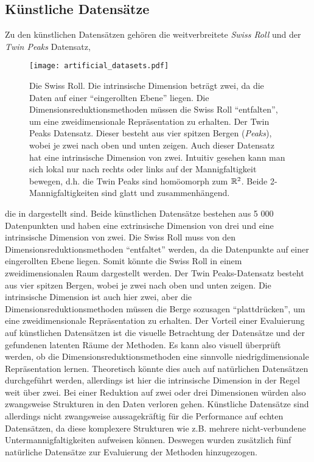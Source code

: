 \subsection{Künstliche Datensätze}
\label{ch:Vergleich:sec:VerwendeteDatensaetze:kuenstlich}
Zu den künstlichen Datensätzen gehören die weitverbreitete \textit{Swiss Roll} und der \textit{Twin Peaks} Datensatz,
\begin{figure}[ht]
	\begin{center}
		\texttt{[image: artificial\_datasets.pdf]}
	\end{center}
	\caption[Künstliche Datensätze]{\figleft Die Swiss Roll. Die intrinsische Dimension beträgt zwei, da die Daten auf einer \enquote{eingerollten Ebene} liegen. Die Dimensionsreduktionsmethoden müssen die Swiss Roll \enquote{entfalten}, um eine zweidimensionale Repräsentation zu erhalten. \figright Der Twin Peaks Datensatz. Dieser besteht aus vier spitzen Bergen (\textit{Peaks}), wobei je zwei nach oben und unten zeigen. Auch dieser Datensatz hat eine intrinsische Dimension von zwei. Intuitiv gesehen kann man sich lokal nur nach rechts oder links auf der Mannigfaltigkeit bewegen, d.h. die Twin Peaks sind homöomorph zum $\mathbb{R}^2$. Beide 2-Mannigfaltigkeiten sind glatt und zusammenhängend.}
	\label{fig:ArtificialDatasets}
\end{figure}
die in  dargestellt sind.
Beide künstlichen Datensätze bestehen aus 5 000 Datenpunkten und haben eine extrinsische Dimension von drei und eine intrinsische
Dimension von zwei. Die Swiss Roll muss von den Dimensionsreduktionsmethoden \enquote{entfaltet} werden, da die Datenpunkte auf einer eingerollten Ebene liegen. Somit könnte die Swiss Roll in einem zweidimensionalen Raum dargestellt werden. Der Twin Peaks-Datensatz besteht aus vier spitzen Bergen, wobei je zwei nach oben und unten zeigen. Die intrinsische Dimension ist auch hier zwei, aber die Dimensionsreduktionsmethoden müssen die Berge sozusagen \enquote{plattdrücken}, um eine zweidimensionale Repräsentation zu erhalten. Der Vorteil einer Evaluierung auf künstlichen Datensätzen ist die visuelle Betrachtung der Datensätze und der gefundenen
latenten Räume der Methoden. Es kann also visuell überprüft werden, ob die Dimensionsreduktionsmethoden eine sinnvolle niedrigdimensionale Repräsentation lernen. Theoretisch könnte dies auch auf natürlichen Datensätzen durchgeführt werden, allerdings ist hier die intrinsische Dimension in der Regel weit über zwei. Bei einer Reduktion auf zwei oder drei Dimensionen würden also zwangsweise Strukturen in den Daten verloren gehen. Künstliche Datensätze sind allerdings nicht zwangsweise aussagekräftig für die Performance auf echten Datensätzen, da diese komplexere Strukturen wie z.B. mehrere nicht-verbundene Untermannigfaltigkeiten aufweisen können. Deswegen wurden zusätzlich fünf natürliche Datensätze zur Evaluierung der Methoden hinzugezogen.

